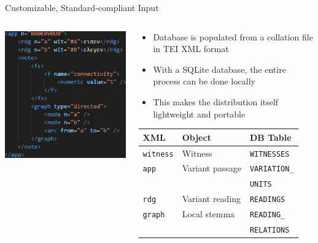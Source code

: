 \documentclass[10pt]{beamer}
\begin{document}
\begin{frame}{Customizable, Standard-compliant Input}
\begin{columns}
\begin{column}{0.4\textwidth}
				\includegraphics[scale=0.6667]{../graphics/app-xml.png}
			\end{column}
			\begin{column}{0.55\textwidth}
				\begin{itemize}
					\item Database is populated from a collation file in TEI XML format
					\item With a SQLite database, the entire process can be done locally
					\item This makes the distribution itself lightweight and portable
				\end{itemize}
				\begin{table}
					\footnotesize
					\begin{tabular}{l|l|l}
						XML & Object & DB Table\\
						\hline
						\hline
						\texttt{witness} & Witness & \texttt{WITNESSES}\\
						\hline
						\texttt{app} & Variant passage & \texttt{VARIATION\_}\\
						 & & \texttt{UNITS}\\
						 \hline
						\texttt{rdg} & Variant reading & \texttt{READINGS}\\
						\hline
						\texttt{graph} & Local stemma & \texttt{READING\_}\\
						 & & \texttt{RELATIONS}
					\end{tabular}
				\end{table}
			\end{column}
		\end{columns}
	\end{frame}
\end{document}
